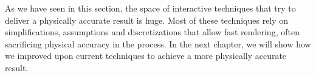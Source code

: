 As we have seen in this section, the space of interactive techniques that try to deliver a physically accurate result is huge. Most of these techniques rely on simplifications, assumptions and discretizations that allow fast rendering, often sacrificing physical accuracy in the process. In the next chapter, we will show how we improved upon current techniques to achieve a more physically accurate result.
